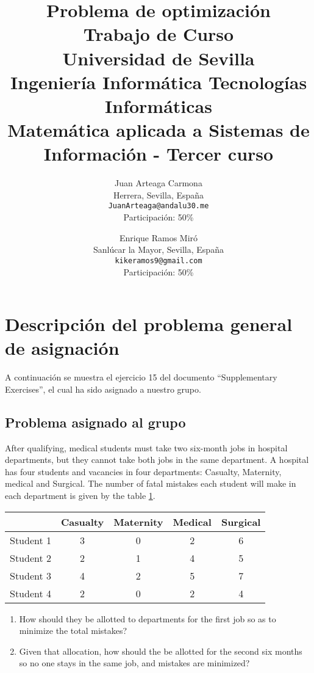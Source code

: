 \documentclass[11pt]{article}
\title{
        \textbf{Problema de optimización}\\
        \medskip
        \large{Trabajo de Curso}\\
        \bigskip
        Universidad de Sevilla\\ Ingeniería Informática Tecnologías Informáticas\\
        Matemática aplicada a Sistemas de Información - Tercer curso}
\author{
Juan Arteaga Carmona\\
Herrera, Sevilla, España \\
\texttt{JuanArteaga@andalu30.me}\\
Participación: 50\%
\and
Enrique Ramos Miró\\
Sanlúcar la Mayor, Sevilla, España \\
\texttt{kikeramos9@gmail.com}\\
Participación: 50\%
}
\begin{document}
\maketitle
\newpage

\tableofcontents
\listoftables
\newpage

\section{Descripción del problema general de asignación}
A continuación se muestra el ejercicio 15 del documento ``Supplementary Exercises'', el cual ha sido asignado a nuestro grupo.

\subsection{Problema asignado al grupo}\label{sec:probasig}
After qualifying, medical students must take two six-month jobs in hospital departments, but they cannot take both jobs in the same department. A hospital has four students and vacancies in four departments: Casualty, Maternity, medical and Surgical. The number of fatal mistakes each student will make in each department is given by the table \ref{tab:tablaProblema}.

\begin{table}[h!]
\centering
\begin{tabular}{@{}lcccc@{}}
\toprule
 & \multicolumn{1}{l}{Casualty} & \multicolumn{1}{l}{Maternity} & \multicolumn{1}{l}{Medical} & \multicolumn{1}{l}{Surgical} \\ \midrule
Student 1 & 3 & 0 & 2 & 6 \\
Student 2 & 2 & 1 & 4 & 5 \\
Student 3 & 4 & 2 & 5 & 7 \\
Student 4 & 2 & 0 & 2 & 4 \\ \bottomrule
\end{tabular}
\label{tab:tablaProblema}
\end{table}

\begin{enumerate}
    \item How should they be allotted to departments for the first job so as to minimize the total mistakes?
    \item Given that allocation, how should the be allotted for the second six months so no one stays in the same job, and mistakes are minimized?
\end{enumerate}
\end{document}
